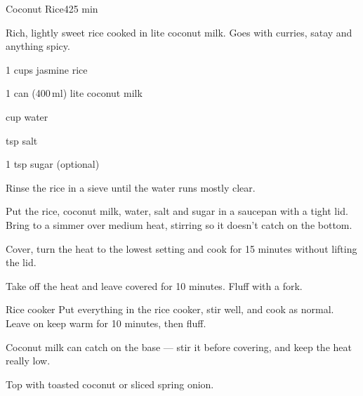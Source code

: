 \begin{recipebox}{Coconut Rice}{4}{25 min}

Rich, lightly sweet rice cooked in lite coconut milk. Goes with curries, satay
and anything spicy.

\begin{ingredients}
  \item 1 cups jasmine rice
  \item 1 can (400\,ml) lite coconut milk
  \item {} cup water
  \item {} tsp salt
  \item 1 tsp sugar (optional)
\end{ingredients}

\begin{method}
  \item Rinse the rice in a sieve until the water runs mostly clear.
  \item Put the rice, coconut milk, water, salt and sugar in a saucepan with a tight lid. Bring to a simmer over medium heat, stirring so it doesn't catch on the bottom.
  \item Cover, turn the heat to the lowest setting and cook for 15 minutes without lifting the lid.
  \item Take off the heat and leave covered for 10 minutes. Fluff with a fork.
\end{method}

\begin{variationbox}{Rice cooker}
Put everything in the rice cooker, stir well, and cook as normal. Leave on keep warm for 10 minutes, then fluff.
\end{variationbox}

\begin{notelist}
  \item Coconut milk can catch on the base --- stir it before covering, and keep the heat really low.
  \item Top with toasted coconut or sliced spring onion.
\end{notelist}

\end{recipebox}
